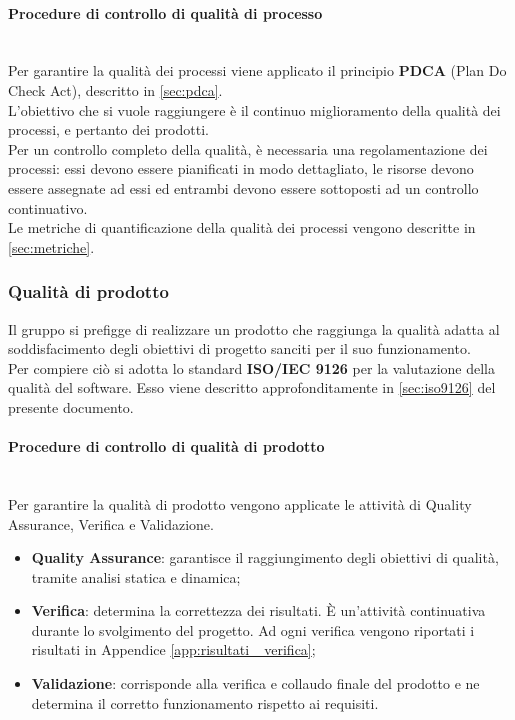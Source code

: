 \paragraph{Procedure di controllo di qualità di processo}\mbox{}\\
Per garantire la qualità dei processi viene applicato il principio \textbf{PDCA} (Plan Do Check Act), descritto in \sezione\ref{sec:pdca}.\\ 
L'obiettivo che si vuole raggiungere è il continuo miglioramento della qualità dei processi, e pertanto dei prodotti.\\
Per un controllo completo della qualità, è necessaria una regolamentazione dei processi: essi devono essere pianificati in modo dettagliato, le risorse devono essere assegnate ad essi ed entrambi devono essere sottoposti ad un controllo continuativo.\\
Le metriche di quantificazione della qualità dei processi vengono descritte in \sezione\ref{sec:metriche}.

\subsubsection{Qualità di prodotto}
Il gruppo si prefigge di realizzare un prodotto che raggiunga la qualità adatta al soddisfacimento degli obiettivi di progetto sanciti per il suo funzionamento.\\
Per compiere ciò si adotta lo standard \textbf{ISO/IEC 9126} per la valutazione della qualità del software. Esso viene descritto approfonditamente in \sezione\ref{sec:iso9126} del presente documento.

\paragraph{Procedure di controllo di qualità di prodotto}\mbox{}\\
Per garantire la qualità di prodotto vengono applicate le attività di Quality Assurance, Verifica e Validazione.
\begin{itemize}
	\item \textbf{Quality Assurance}: garantisce il raggiungimento degli obiettivi di qualità, tramite analisi statica e dinamica;
	\item \textbf{Verifica}: determina la correttezza dei risultati. È un’attività continuativa durante lo svolgimento del progetto. Ad ogni verifica vengono riportati i risultati in Appendice \ref{app:risultati _verifica};
	\item \textbf{Validazione}: corrisponde alla verifica e collaudo finale del prodotto e ne determina il corretto funzionamento rispetto ai requisiti.
\end{itemize}

